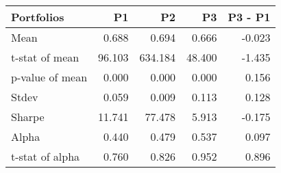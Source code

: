 \begin{tabular}{lrrrr}
\toprule
Portfolios & P1 & P2 & P3 & P3 - P1 \\
\midrule
Mean & 0.688 & 0.694 & 0.666 & -0.023 \\
t-stat of mean & 96.103 & 634.184 & 48.400 & -1.435 \\
p-value of mean & 0.000 & 0.000 & 0.000 & 0.156 \\
Stdev & 0.059 & 0.009 & 0.113 & 0.128 \\
Sharpe & 11.741 & 77.478 & 5.913 & -0.175 \\
Alpha & 0.440 & 0.479 & 0.537 & 0.097 \\
t-stat of alpha & 0.760 & 0.826 & 0.952 & 0.896 \\
\bottomrule
\end{tabular}

